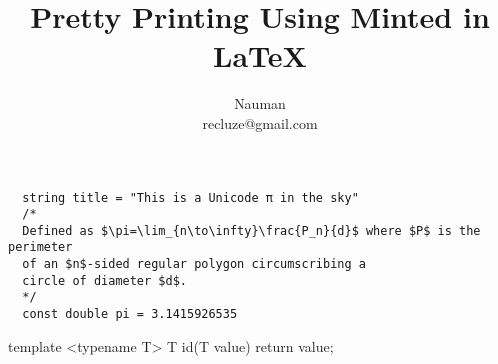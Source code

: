 \documentclass{article}
\begin{document}
\title{Pretty Printing Using Minted in \LaTeX}
\author{Nauman \\ recluze@gmail.com}
\maketitle

\begin{verbatim}
  string title = "This is a Unicode π in the sky"
  /*
  Defined as $\pi=\lim_{n\to\infty}\frac{P_n}{d}$ where $P$ is the perimeter
  of an $n$-sided regular polygon circumscribing a
  circle of diameter $d$.
  */
  const double pi = 3.1415926535
\end{verbatim}



\begin{cppcode}
template <typename T>
 T id(T value) {
  return value;
 }
\end{cppcode}


\newpage


\inputminted[linenos,
               numbersep=5pt,
               frame=lines,
               framesep=2mm]{java}{Sign.java}
\end{document}
